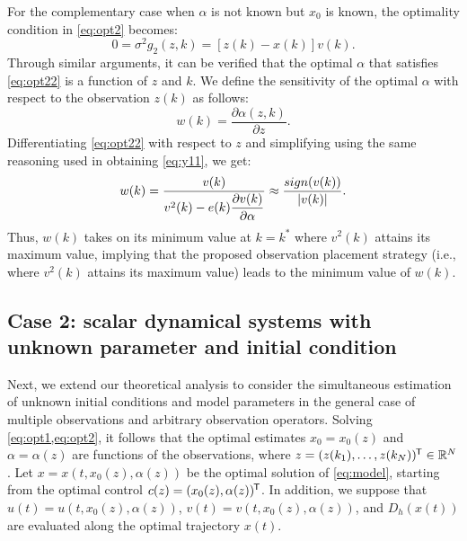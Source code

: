 \documentclass{article}
\newcommand*{\tran}{^{\mkern-1.5mu\mathsf{T}}}
\begin{document}
For the complementary case when $\alpha$ is not known but $x_0$ is known, the optimality condition in \cref{eq:opt2} becomes:
\begin{equation}
    0 = \sigma^2 g_2(z,k) = [z(k) - x(k)]v(k). \label{eq:opt22}
\end{equation}
Through similar arguments, it can be verified that the optimal $\alpha$ that satisfies \cref{eq:opt22} is a function of $z$ and $k$. We define the sensitivity of the optimal $\alpha$ with respect to the observation $z(k)$ as follows:
\begin{equation}
    w(k) = \dfrac{\partial \alpha(z,k)}{\partial z}.
\end{equation}
Differentiating \cref{eq:opt22} with respect to $z$ and simplifying using the same reasoning used in obtaining \cref{eq:y11}, we get:
\begin{equation}
    w(k) = \dfrac{v(k)}{v^2(k) - e(k) \dfrac{\partial v(k)}{\partial \alpha}} \approx \textcolor{rev2}{\dfrac{sign(v(k))}{|v(k)|}}.
\end{equation}
Thus, $w(k)$ takes on its minimum value at $k = k^*$ where $v^2(k)$ attains its maximum value, implying that the proposed observation placement strategy (i.e., where $v^2(k)$ attains its maximum value) leads to the minimum value of $w(k)$. 

\subsection{Case 2: scalar dynamical systems with unknown parameter and initial condition}
Next, we extend our theoretical analysis to consider the simultaneous estimation of unknown initial conditions and model parameters in the general case of multiple observations and arbitrary observation operators. Solving \cref{eq:opt1,eq:opt2}, it follows that the optimal estimates $x_0 = x_0(z)$ and $\alpha = \alpha(z)$ are functions of the observations, where $z = (z(k_1), \dots, z(k_N))\tran \in \mathbb{R}^N$. Let $x=x(t,x_0(z),\alpha(z))$ be the optimal solution of \cref{eq:model}, starting from the optimal control $c(z) = (x_0 (z), \alpha(z))\tran$. In addition, we suppose that $u(t) = u(t,x_0(z),\alpha(z))$, $v(t) = v(t,x_0(z),\alpha(z))$, and $D_h(x(t))$ are evaluated along the optimal trajectory $x(t)$.
\end{document}
